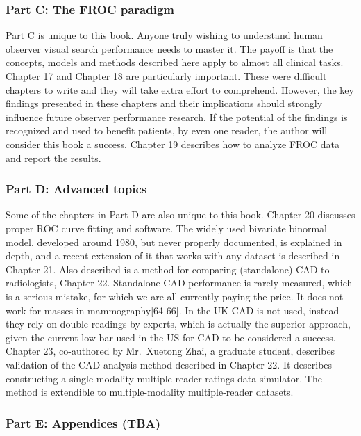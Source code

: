 \documentclass[
]{book}
\begin{document}
\hypertarget{part-c-the-froc-paradigm}{%
\subsubsection{Part C: The FROC paradigm}\label{part-c-the-froc-paradigm}}

Part C is unique to this book. Anyone truly wishing to understand human observer visual search performance needs to master it. The payoff is that the concepts, models and methods described here apply to almost all clinical tasks. Chapter 17 and Chapter 18 are particularly important. These were difficult chapters to write and they will take extra effort to comprehend. However, the key findings presented in these chapters and their implications should strongly influence future observer performance research. If the potential of the findings is recognized and used to benefit patients, by even one reader, the author will consider this book a success. Chapter 19 describes how to analyze FROC data and report the results.

\hypertarget{part-d-advanced-topics}{%
\subsubsection{Part D: Advanced topics}\label{part-d-advanced-topics}}

Some of the chapters in Part D are also unique to this book. Chapter 20 discusses proper ROC curve fitting and software. The widely used bivariate binormal model, developed around 1980, but never properly documented, is explained in depth, and a recent extension of it that works with any dataset is described in Chapter 21. Also described is a method for comparing (standalone) CAD to radiologists, Chapter 22. Standalone CAD performance is rarely measured, which is a serious mistake, for which we are all currently paying the price. It does not work for masses in mammography{[}64-66{]}. In the UK CAD is not used, instead they rely on double readings by experts, which is actually the superior approach, given the current low bar used in the US for CAD to be considered a success. Chapter 23, co-authored by Mr.~Xuetong Zhai, a graduate student, describes validation of the CAD analysis method described in Chapter 22. It describes constructing a single-modality multiple-reader ratings data simulator. The method is extendible to multiple-modality multiple-reader datasets.

\hypertarget{part-e-appendices-tba}{%
\subsubsection{Part E: Appendices (TBA)}\label{part-e-appendices-tba}}
\end{document}
